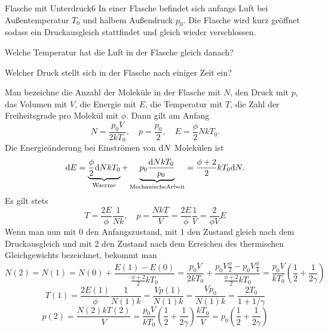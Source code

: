 \begin{problem}{Flasche mit Unterdruck}{6}
In einer Flasche befindet sich anfangs Luft bei Außentemperatur $T_0$ und halbem Außendruck $p_0$. Die Flasche wird kurz geöffnet sodass ein Druckausgleich stattfindet und gleich wieder verschlossen.
\begin{abcenum}
\item Welche Temperatur hat die Luft in der Flasche gleich danach?
\item Welcher Druck stellt sich in der Flasche nach einiger Zeit ein?
\end{abcenum}
\begin{solution}
Man bezeichne die Anzahl der Moleküle in der Flasche mit $N$, den Druck mit $p$, das Volumen mit $V$, die Energie mit $E$, die Temperatur mit $T$, die Zahl der Freiheitsgrade pro Molekül mit $\phi$. Dann gilt am Anfang
\[
N = \frac{p_0 V}{2 k T_0}, \quad p = \frac{p_0}{2}, \quad E = \frac{\phi}{2} N k T_0.
\]
Die Energieänderung bei Einströmen von $\mathrm{d} N$ Molekülen ist
\[
\mathrm{d} E = \underbrace{\frac\phi2 \mathrm{d} N k T_0}_\mathrm{Waerme} + \underbrace{p_0 \frac{\mathrm{d} N k T_0}{p_0}}_\mathrm{Mechanische Arbeit} = \frac{\phi+2}{2} k T_0 \mathrm{d} N.
\]
Es gilt stets
\[
T=\frac{2 E}{\phi}\frac{1}{N k}, \quad  p = \frac{NkT}{V} = \frac{2 E}{\phi} \frac1V = \frac{2}{\phi V}  E
\]
Wenn man nun mit 0 den Anfangszustand, mit 1 den Zustand gleich nach dem Druckausgleich und mit 2 den Zustand nach dem Erreichen des thermischen Gleichgewichts bezeichnet, bekommt man
\[
N(2) = N(1) = N(0) + \frac{E(1) - E(0)}{\frac{\phi+2}{2} k T_0} = \frac{p_0 V}{2 k T_0} + \frac{p_0 V \frac{\phi}{2} - p_0 V \frac{\phi}{4}}{\frac{\phi+2}{2} k T_0} = \frac{p_0 V}{k T_0} \left( \frac12 + \frac1{2\gamma} \right)
\]
\[
T(1) = \frac{2 E(1)}{\phi}\frac{1}{N(1) k} = \frac{V p(1)}{N(1) k} = \frac{V p_0}{N(1) k} = \frac{2 T_0}{1+1/\gamma}
\]
\[
p(2) = \frac{N(2) k T(2)}{V} = \frac{p_0 V}{k T_0} \left( \frac12 + \frac1{2\gamma} \right) \frac{k T_0}{V} = p_0 \left( \frac12 + \frac1{2\gamma} \right)
\]
\end{solution}
\end{problem}

